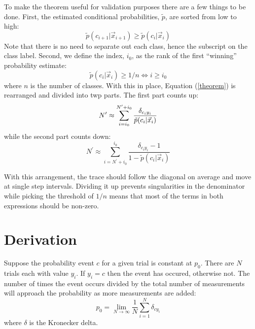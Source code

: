 \documentclass{article}
\begin{document}
To make the theorem useful for validation purposes there are a few things 
to be done.
First, the estimated conditional probabilities, $\tilde p$, are sorted from
low to high:
\begin{equation}
	\tilde p(c_{i+1}|\vec x_{i+1}) \ge \tilde p(c_i|\vec x_i)
\end{equation}
Note that there is no need to separate out each class, hence the subscript
on the class label.
Second, we define the index, $i_0$, as the rank of the first ``winning''
probability estimate:
\begin{equation}
	\tilde p(c_i | \vec x_i) \ge 1/n \iff i \ge i_0
\end{equation}
where $n$ is the number of classes.
With this in place, Equation (\ref{theorem}) is rearranged 
and divided into twp parts.
The first part counts up:
\begin{equation}
	N^\prime \approx 
	\sum_{i=i_0}^{N^\prime+i_0} \frac{\delta_{c_iy_i}}{\tilde p(c_i | \vec x_i)} \\
\end{equation}
while the second part counts down:
\begin{equation}
	N^\prime \approx \sum_{i=N^\prime+i_0}^{i_0} \frac{\delta_{c_iy_i} - 1}{1 - \tilde p(c_i | \vec x_i)}
\end{equation}

With this arrangement, the trace should follow the diagonal on average and
move at single step intervals.
Dividing it up prevents singularities in the denominator while picking the
threshold of $1/n$ means that most of the terms in both expressions should
be non-zero.


\section{Derivation}

Suppose the probability event $c$ for a given trial is constant at $p_0$.
There are $N$ trials each with value $y_i$. 
If $y_i=c$ then the event has occured, otherwise not.
The number of times the event occurs divided by the total number of
measurements will approach the probability as more measurements are added:
\begin{equation}
p_0 = \lim_{N \rightarrow \infty} \frac{1}{N}\sum_{i=1}^N \delta_{cy_i}
\end{equation}
where $\delta$ is the Kronecker delta.
\end{document}
